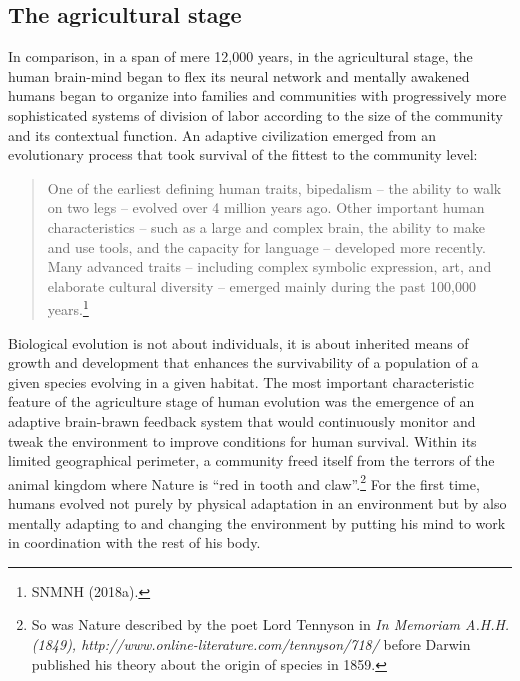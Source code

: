 \begin{multicols}{2}
\subsection*{The agricultural stage}
\vskip -6pt

In comparison, in a span of mere 12,000 years, in the agricultural stage, the human brain-mind began to flex its neural network and mentally awakened humans began to organize into families and communities with progressively more sophisticated systems of division of labor according to the size of the community and its contextual function. An adaptive civilization emerged from an evolutionary process that took survival of the fittest to the community level:


\begin{quote}
One of the earliest defining human traits, bipedalism – the ability to walk on two legs – evolved over 4 million years ago. Other important human characteristics – such as a large and complex brain, the ability to make and use tools, and the capacity for language – developed more recently. Many advanced traits – including complex symbolic expression, art, and elaborate cultural diversity – emerged mainly during the past 100,000 years.\footnote{SNMNH (2018a).}
\end{quote}

Biological evolution is not about individuals, it is about inherited means of growth and development that enhances the survivability of a population of a given species evolving in a given habitat. The most important characteristic feature of the agriculture stage of human evolution was the emergence of an adaptive brain-brawn feedback system that would continuously monitor and tweak the environment to improve conditions for human survival. Within its limited geographical perimeter, a community freed itself from the terrors of the animal kingdom where Nature is “red in tooth and claw”.\footnote{So was Nature described by the poet Lord Tennyson in \textit{In Memoriam A.H.H. (1849), http://www.online-literature.com/tennyson/718/} before Darwin published his theory about the origin of species in 1859.} For the first time, humans evolved not purely by physical adaptation in an environment but by also mentally adapting to and changing the environment by putting his mind to work in coordination with the rest of his body.


\end{multicols}
